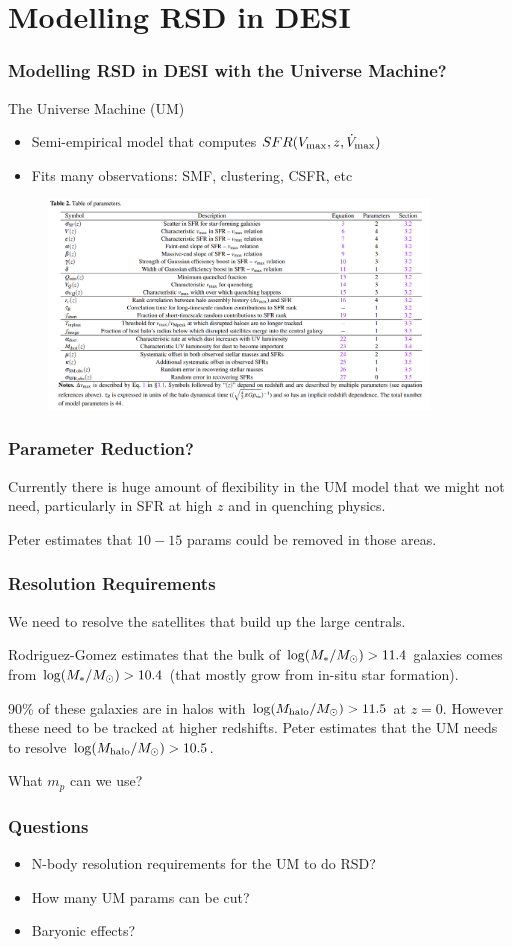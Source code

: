\documentclass[t]{beamer}
\begin{document}
\section{Modelling RSD in DESI}
\begin{frame}
    \frametitle{Modelling RSD in DESI with the Universe Machine?}

    \begin{block}{The Universe Machine (UM)}
        \begin{itemize}
            \item{Semi-empirical model that computes $SFR(V_{\rm max}{}, z, \dot{V}_{\rm max})$}
            \item{Fits many observations: SMF, clustering, CSFR, etc}
        \end{itemize}
    \end{block}

    \begin{figure}
    \includegraphics[width=0.9\textwidth]{other_images/um_params.png}
    \end{figure}
\end{frame}

\begin{frame}
    \frametitle{Parameter Reduction?}

    Currently there is huge amount of flexibility in the UM model that we might not need, particularly in SFR at high $z$ and in quenching physics.

    Peter estimates that $10-15$ params could be removed in those areas.
\end{frame}

\begin{frame}
    \frametitle{Resolution Requirements}

    We need to resolve the satellites that build up the large centrals.

    Rodriguez-Gomez estimates that the bulk of ${\rm log}{}(M_{\ast}{} / \mbox{$M_{\odot}$}{}) > 11.4$ galaxies comes from ${\rm log}{}(M_{\ast}{} / \mbox{$M_{\odot}$}{}) > 10.4$ (that mostly grow from in-situ star formation).

    90\% of these galaxies are in halos with ${\rm log}{}(M_{\rm halo}{} / \mbox{$M_{\odot}$}{}) > 11.5$ at $z = 0$. However these need to be tracked at higher redshifts. Peter estimates that the UM needs to resolve ${\rm log}{}(M_{\rm halo}{} / \mbox{$M_{\odot}$}{}) > 10.5$.

    What $m_p$ can we use?

\end{frame}


\begin{frame}
    \frametitle{Questions}
    \begin{itemize}
        \item{N-body resolution requirements for the UM to do RSD?}
        \item{How many UM params can be cut?}
        \item{Baryonic effects?}
    \end{itemize}
\end{frame}
\end{document}

